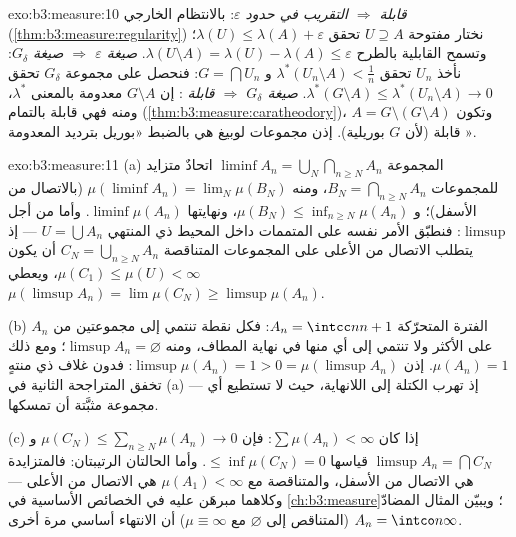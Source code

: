 \begin{solution}{exo:b3:measure:10}
\emph{قابلة  $\Rightarrow$ التقريب في حدود $\varepsilon$}:
بالانتظام الخارجي (\cref{thm:b3:measure:regularity}) نختار مفتوحة $U \supseteq A$
تحقق $\lambda(U) \leq \lambda(A) +
\varepsilon$؛ وتسمح القابلية  بالطرح $\lambda(U\setminus A) = \lambda(U) - \lambda(A) \leq
\varepsilon$.
\emph{صيغة $\varepsilon$ $\Rightarrow$ صيغة $G_\delta$}: نأخذ
$U_n$ تحقق $\lambda^*(U_n\setminus
A) < \frac1n$ و $G = \bigcap U_n$: فنحصل على مجموعة $G_\delta$ تحقق
$\lambda^*(G\setminus A) \leq \lambda^*(U_n\setminus A) \to 0$. \emph{صيغة $G_\delta$ $\Rightarrow$ قابلة }: إن
$G\setminus
A$ معدومة بالمعنى $\lambda^*$، ومنه فهي قابلة 
بالتمام (\cref{thm:b3:measure:caratheodory})، وتكون $A = G \setminus
(G\setminus A)$ قابلة  (لأن $G$
بوريلية). إذن مجموعات لوبيغ هي بالضبط «بوريل بترديد المعدومة
».
\end{solution}

\begin{solution}{exo:b3:measure:11}
(a) المجموعة $\liminf A_n = \bigcup_N\bigcap_{n\geq N}A_n$ اتحادٌ متزايد للمجموعات $B_N = \bigcap_{n\geq N}A_n$، ومنه $\mu(\liminf A_n) = \lim_N\mu(B_N)$
(بالاتصال من الأسفل)؛ و $\mu(B_N) \leq \inf_{n \geq N}\mu(A_n)$، ونهايتها $\liminf\mu(A_n)$. وأما من أجل
$\limsup$: فنطبّق الأمر نفسه على المتممات داخل المحيط ذي 
المنتهي $U = \bigcup A_n$ --- إذ يتطلب الاتصال من الأعلى على المجموعات
المتناقصة $C_N = \bigcup_{n\geq N}A_n$ أن يكون $\mu(C_1)
\leq \mu(U) < \infty$، ويعطي $\mu(\limsup A_n) =
\lim\mu(C_N) \geq \limsup\mu(A_n)$.

(b) الفترة المتحرّكة $A_n = \intcc n{n+1}$: فكل نقطة تنتمي إلى مجموعتين من
$A_n$ على الأكثر ولا تنتمي إلى أي منها في نهاية المطاف، ومنه
$\limsup A_n = \varnothing$؛ ومع ذلك $\mu(A_n) = 1$. إذن $\limsup\mu(A_n) = 1 > 0 = \mu(\limsup A_n)$: فدون غلاف ذي
 منتهٍ تخفق المتراجحة الثانية في (a) --- إذ تهرب الكتلة إلى
اللانهاية، حيث لا تستطيع أي مجموعة مثبَّتة أن تمسكها.

(c) إذا كان $\sum\mu(A_n) < \infty$: فإن $\mu(C_N) \leq
\sum_{n\geq N}\mu(A_n) \to 0$ و $\limsup A_n =
\bigcap C_N$ قياسها $\leq \inf\mu(C_N) = 0$. وأما
الحالتان الرتيبتان: فالمتزايدة هي الاتصال من الأسفل، والمتناقصة
مع $\mu(A_1) < \infty$ هي الاتصال من الأعلى --- وكلاهما مبرهَن عليه في
الخصائص الأساسية في \cref{ch:b3:measure}؛ ويبيّن المثال المضادّ $A_n = \intco n\infty$
(المتناقص إلى $\varnothing$ مع $\mu \equiv \infty$) أن الانتهاء أساسي مرة
أخرى.
\end{solution}

